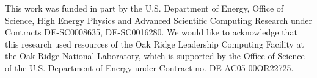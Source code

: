 \documentclass{webofc}
\begin{document}
\begin{acknowledgement}
	This work was funded in part by the U.S. Department of Energy, Office of Science, High Energy Physics and Advanced Scientific Computing Research under Contracts DE-SC0008635, DE-SC0016280. We would like to acknowledge that this research used resources of the Oak Ridge Leadership Computing Facility at the Oak Ridge National Laboratory, which is supported by the Office of Science of the U.S. Department of Energy under Contract no. DE-AC05-00OR22725.
\end{acknowledgement}


%

\end{document}
